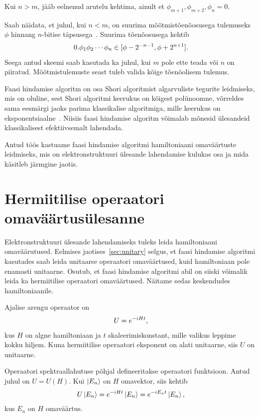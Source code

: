 \documentclass[12pt]{report}
\def\ket#1{\mathinner{|#1\rangle}}
\begin{document}
Kui \(n > m\), jääb eelnenud arutelu kehtima, ainult et \(\phi_{m+1}, \phi_{m+2}, \phi_n = 0\).

Saab näidata, et juhul, kui \(n < m\), on suurima mõõtmistõenõosusega tulemuseks \(\phi\) hinnang \(n\)-bitise täpsusega~\cite{kaye+laflamme+mosca}.
Suurima tõenõosusega kehtib
\begin{equation}
    0.\phi_1\phi_2\cdots\phi_n \in [\phi - 2^{-n-1}, \phi + 2^{n+1}] \rlap{.}
\end{equation}
Seega antud skeemi saab kasutada ka juhul, kui \(m\) pole ette teada või \(n\) on piiratud.
Mõõtmis\-tulemuste seast tuleb valida kõige tõenõolisem tulemus.

Faasi hindamise algoritm on osa Shori algoritmist algarvuliste tegurite leidmiseks, mis on oluline, sest Shori algoritmi keerukus on kõigest polünoomne, võrreldes sama eesmärgi jaoks parima klassikalise algoritmiga, mille keerukus on eksponentsiaalne~\cite{cao+etal, kaye+laflamme+mosca}.
Niisiis faasi hindamise algoritm võimalab mõnesid ülesandeid klassikalisest efektiivsemalt lahendada.

Antud töös kastuame faasi hindamise algoritmi hamiltoniaani omaväärtuste leidmiseks, mis on elektronstruktuuri ülesande lahendamise kulukas osa ja mida käsitleb järmgine jaotis.

\section{Hermiitilise operaatori omaväärtusülesanne}\label{sec:hermit}

Elektronstruktuuri ülesande lahendamiseks tuleks leida hamiltoniaani omaväärutused.
Eelmises jaotises~\ref{sec:unitary} selgus, et faasi hindamise algoritmi kasutades saab leida unitaarse operaatori omaväärtused, kuid hamiltoniaan pole enamasti unitaarne.
Osutub, et faasi hindamise algoritmi abil on siiski võimalik leida ka hermiitilise operaatori omaväärtused.
Näitame sedas keskendudes hamiltoniaanile.

Ajalise arengu operaator on
\begin{align}
    U = e^{-iHt} \rlap{,}
\end{align}
kus \(H\) on algne hamiltoniaan ja \(t\) skaleerimiskonstant, mille valikus leppime kokku hiljem.
Kuna hermiitilise operaatori eksponent on alati unitaarne, siis \(U\) on unitaarne.

Operaatori spektraallahutuse põhjal defineeritakse operaatori funktsioon.
Antud juhul on \(U=U(H)\).
Kui \(\ket{E_n}\) on \(H\) omavektor, siis kehtib
\begin{align}\label{f:eigenhermit}
    U \ket{E_n} = e^{-iHt}\ket{E_n} = e^{-i E_n t} \ket{E_n} \rlap{,}
\end{align}
kus \(E_n\) on \(H\) omaväärtus.
\end{document}
